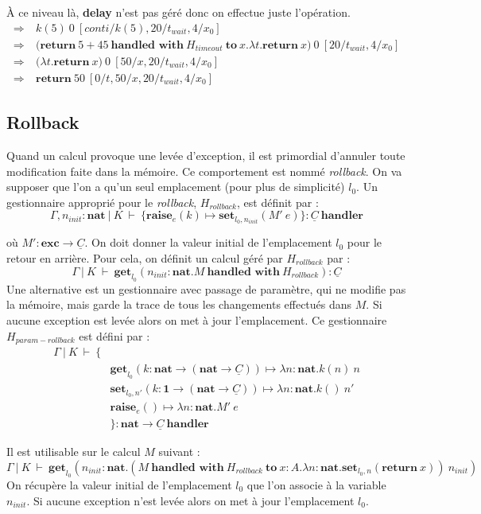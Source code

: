 \begin{exemple}
		À ce niveau là, \textbf{delay} n'est pas géré donc on effectue juste l'opération.
		\begin{align*}
			\Rightarrow &~k(5)~0~[conti/k(5),20/t_{wait},4/x_0]\\
			\Rightarrow &~\textbf{(}\textbf{return}~5 + 45 ~\textbf{handled~with}~H_{timeout}~\textbf{to}~x.\lambda t.\textbf{return}~x\textbf{)}~0~[20/t_{wait},4/x_0]\\
			\Rightarrow &~\textbf{(}\lambda t.\textbf{return}~x\textbf{)}~0~[50/x,20/t_{wait},4/x_0]\\
			\Rightarrow &~\textbf{return}~50~[0/t,50/x,20/t_{wait},4/x_0]
		\end{align*}
	\end{exemple}
	
\newpage
\subsection{Rollback}

	Quand un calcul provoque une levée d'exception, il est primordial d'annuler toute modification faite dans la mémoire. Ce comportement est nommé \textit{rollback}. On va supposer que l'on a qu'un seul emplacement (pour plus de simplicité) $l_0$. Un gestionnaire approprié pour le \textit{rollback}, $H_{rollback}$, est définit par : 
	\[\Gamma,n_{init}:\textbf{nat}~|~K~\vdash~\{ \textbf{raise}_e(k) \mapsto \textbf{set}_{l_0,n_{init}}(M'~e) \} :\underline{C}~\textbf{handler}\]
		
	où $M' : \textbf{exc} \rightarrow \underline{C}$. On doit donner la valeur initial de l'emplacement $l_0$ pour le retour en arrière. Pour cela, on définit un calcul géré par $H_{rollback}$ par :
	\[\Gamma~|~K~\vdash~\textbf{get}_{l_0}(n_{init}:\textbf{nat}.M~\textbf{handled~with}~H_{rollback}) :\underline{C}\]
	Une alternative est un gestionnaire avec passage de paramètre, qui ne modifie pas la mémoire, mais garde la trace de tous les changements effectués dans $M$. Si aucune exception est levée alors on met à jour l'emplacement. Ce gestionnaire $H_{param-rollback}$ est défini par : 
	\begin{align*}
		\Gamma~|~K~\vdash~\{ &\\
		&\textbf{get}_{l_0}(k:\textbf{nat} \rightarrow (\textbf{nat} \rightarrow \underline{C})) \mapsto \lambda n:\textbf{nat}.k(n)~n\\
		&\textbf{set}_{l_0,n'}(k:\textbf{1} \rightarrow (\textbf{nat} \rightarrow \underline{C})) \mapsto \lambda n:\textbf{nat}.k()~n'\\
		&\textbf{raise}_e() \mapsto \lambda n:\textbf{nat}.M'~e\\
		&\} : \textbf{nat} \rightarrow \underline{C}~\textbf{handler}
	\end{align*}
 
 	Il est utilisable sur le calcul $M$ suivant :
 	\[\Gamma~|~K~\vdash~\textbf{get}_{l_0}(n_{init}:\textbf{nat}.(M~\textbf{handled~with}~H_{rollback}~\textbf{to}~x:A.\lambda n:\textbf{nat}.\textbf{set}_{l_0,n}(\textbf{return}~x))~n_{init})\]
 	On récupère la valeur initial de l'emplacement $l_0$ que l'on associe à la variable $n_{init}$. Si aucune exception n'est levée alors on met à jour l'emplacement $l_0$.
 	
 	
	